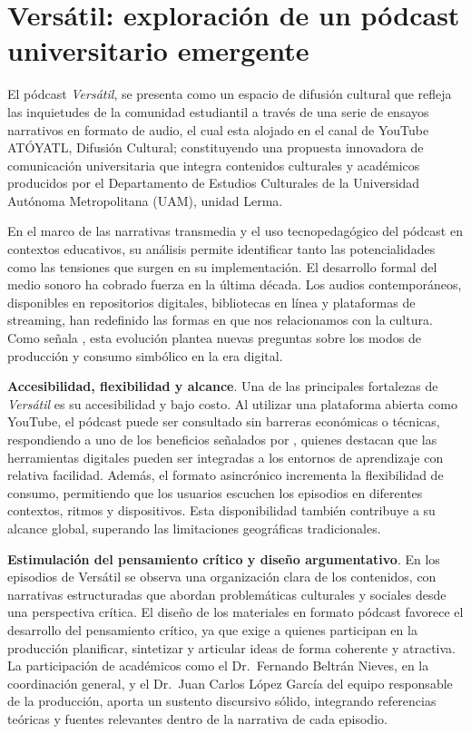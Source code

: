 \documentclass[
  spanish,
  11pt,
  a4paper,
]{scrbook}
\begin{document}
\section*{Versátil: exploración de un pódcast universitario
emergente}\label{versuxe1til-exploraciuxf3n-de-un-puxf3dcast-universitario-emergente}


El pódcast \emph{Versátil}, se presenta como un espacio de difusión
cultural que refleja las inquietudes de la comunidad estudiantil a
través de una serie de ensayos narrativos en formato de audio, el cual
esta alojado en el canal de YouTube ATÓYATL, Difusión Cultural;
constituyendo una propuesta innovadora de comunicación universitaria que
integra contenidos culturales y académicos producidos por el
Departamento de Estudios Culturales de la Universidad Autónoma
Metropolitana (UAM), unidad Lerma.

En el marco de las narrativas transmedia y el uso tecnopedagógico del
pódcast en contextos educativos, su análisis permite identificar tanto
las potencialidades como las tensiones que surgen en su implementación.
El desarrollo formal del medio sonoro ha cobrado fuerza en la última
década. Los audios contemporáneos, disponibles en repositorios
digitales, bibliotecas en línea y plataformas de streaming, han
redefinido las formas en que nos relacionamos con la cultura. Como
señala \textcite{BeltranNieves2024}, esta evolución plantea nuevas
preguntas sobre los modos de producción y consumo simbólico en la era
digital.

\textbf{Accesibilidad, flexibilidad y alcance}. Una de las principales
fortalezas de \emph{Versátil} es su accesibilidad y bajo costo. Al
utilizar una plataforma abierta como YouTube, el pódcast puede ser
consultado sin barreras económicas o técnicas, respondiendo a uno de los
beneficios señalados por \textcite{McLoughlin2010}, quienes destacan que
las herramientas digitales pueden ser integradas a los entornos de
aprendizaje con relativa facilidad. Además, el formato asincrónico
incrementa la flexibilidad de consumo, permitiendo que los usuarios
escuchen los episodios en diferentes contextos, ritmos y dispositivos.
Esta disponibilidad también contribuye a su alcance global, superando
las limitaciones geográficas tradicionales.

\textbf{Estimulación del pensamiento crítico y diseño argumentativo}. En
los episodios de Versátil se observa una organización clara de los
contenidos, con narrativas estructuradas que abordan problemáticas
culturales y sociales desde una perspectiva crítica. El diseño de los
materiales en formato pódcast favorece el desarrollo del pensamiento
crítico, ya que exige a quienes participan en la producción planificar,
sintetizar y articular ideas de forma coherente y atractiva. La
participación de académicos como el Dr.~Fernando Beltrán Nieves, en la
coordinación general, y el Dr.~Juan Carlos López García del equipo
responsable de la producción, aporta un sustento discursivo sólido,
integrando referencias teóricas y fuentes relevantes dentro de la
narrativa de cada episodio.
\end{document}
